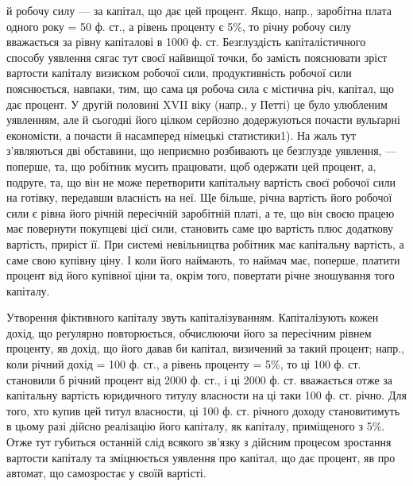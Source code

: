 й робочу силу — за капітал, що дає цей процент. Якщо, напр., заробітна плата
одного року = 50 ф. ст., а рівень проценту є 5\%, то річну робочу силу вважається
за рівну капіталові в 1000 ф. ст. Безглуздість капіталістичного способу
уявлення сягає тут своєї найвищої точки, бо замість пояснювати зріст вартости
капіталу визиском робочої сили, продуктивність робочої сили пояснюється, навпаки,
тим, що сама ця робоча сила є містична річ, капітал, що дає процент.
У другій половині XVII віку (напр., у Петті) це було улюбленим уявленням,
але й сьогодні його цілком серйозно додержуються почасти вульґарні економісти,
а почасти й насамперед німецькі статистики1). На жаль тут з’являються дві
обставини, що неприємно розбивають це безглузде уявлення, — поперше, та, що
робітник мусить працювати, щоб одержати цей процент, а, подруге, та, що він
не може перетворити капітальну вартість своєї робочої сили на готівку, передавши
власність на неї. Ще більше, річна вартість його робочої сили є рівна
його річній пересічній заробітній платі, а те, що він своєю працею має повернути
покупцеві цієї сили, становить саме цю вартість плюс додаткову вартість,
приріст її. При системі невільництва робітник має капітальну вартість, а саме
свою купівну ціну. І коли його наймають, то наймач має, поперше, платити
процент від його купівної ціни та, окрім того, повертати річне зношування
того капіталу.

Утворення фіктивного капіталу звуть капіталізуванням. Капіталізують кожен
дохід, що реґулярно повторюється, обчислюючи його за пересічним рівнем проценту,
яв дохід, що його давав би капітал, визичений за такий процент; напр.,
коли річний дохід = 100 ф. ст., а рівень проценту = 5\%, то ці 100 ф. ст.
становили б річний процент від 2000 ф. ст., і ці 2000 ф. ст. вважається отже
за капітальну вартість юридичного титулу власности на ці таки 100 ф. ст.
річно. Для того, хто купив цей титул власности, ці 100 ф. ст. річного доходу
становитимуть в цьому разі дійсно реалізацію його капіталу, як капіталу, приміщеного
з 5\%. Отже тут губиться останній слід всякого зв’язку з дійсним
процесом зростання вартости капіталу та зміцнюється уявлення про капітал, що
дає процент, яв про автомат, що самозростає у своїй вартісті.

